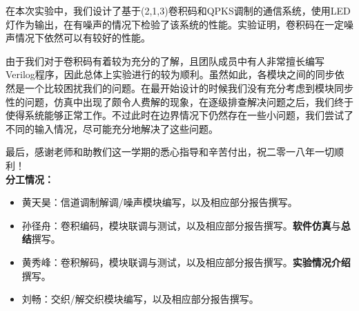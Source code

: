 在本次实验中，我们设计了基于(2,1,3)卷积码和QPKS调制的通信系统，使用LED灯作为输出，在有噪声的情况下检验了该系统的性能。实验证明，卷积码在一定噪声情况下依然可以有较好的性能。

由于我们对于卷积码有着较为充分的了解，且团队成员中有人非常擅长编写Verilog程序，因此总体上实验进行的较为顺利。虽然如此，各模块之间的同步依然是一个比较困扰我们的问题。在最开始设计的时候我们没有充分考虑到模块同步性的问题，仿真中出现了颇令人费解的现象，在逐级排查解决问题之后，我们终于使得系统能够正常工作。不过此时在边界情况下仍然存在一些小问题，我们尝试了不同的输入情况，尽可能充分地解决了这些问题。

最后，感谢老师和助教们这一学期的悉心指导和辛苦付出，祝二零一八年一切顺利！\\




{\bf \Large 分工情况：}
\begin{itemize}
\item 黄天昊：信道调制解调/噪声模块编写，以及相应部分报告撰写。
\item 孙径舟：卷积编码，模块联调与测试，以及相应部分报告撰写。{\bf 软件仿真}与{\bf 总结}撰写。
\item 黄秀峰：卷积解码，模块联调与测试，以及相应部分报告撰写。{\bf 实验情况介绍}撰写。
\item 刘畅：交织/解交织模块编写，以及相应部分报告撰写。
\end{itemize}

